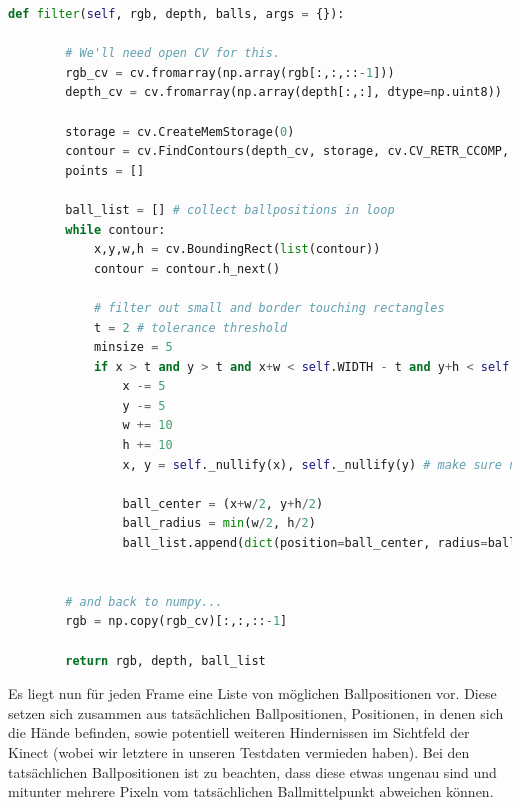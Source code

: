 \documentclass[12pt,a4paper,ngerman]{scrartcl}
\begin{document}
\vspace{0.5cm}
\begin{lstlisting}[language=Python,caption={RectsFilter.py, Ausschnitt}]
    def filter(self, rgb, depth, balls, args = {}):

        # We'll need open CV for this.
        rgb_cv = cv.fromarray(np.array(rgb[:,:,::-1]))
        depth_cv = cv.fromarray(np.array(depth[:,:], dtype=np.uint8))

        storage = cv.CreateMemStorage(0)
        contour = cv.FindContours(depth_cv, storage, cv.CV_RETR_CCOMP, cv.CV_CHAIN_APPROX_SIMPLE)
        points = []

        ball_list = [] # collect ballpositions in loop
        while contour:
            x,y,w,h = cv.BoundingRect(list(contour))
            contour = contour.h_next()

            # filter out small and border touching rectangles
            t = 2 # tolerance threshold
            minsize = 5
            if x > t and y > t and x+w < self.WIDTH - t and y+h < self.HEIGHT - t and w > minsize and h > minsize:
                x -= 5
                y -= 5
                w += 10
                h += 10
                x, y = self._nullify(x), self._nullify(y) # make sure nothing is smaller than 0

                ball_center = (x+w/2, y+h/2)
                ball_radius = min(w/2, h/2)
                ball_list.append(dict(position=ball_center, radius=ball_radius))


        # and back to numpy...
        rgb = np.copy(rgb_cv)[:,:,::-1]

        return rgb, depth, ball_list
\end{lstlisting}

Es liegt nun für jeden Frame eine Liste von möglichen Ballpositionen vor. Diese setzen sich zusammen aus tatsächlichen Ballpositionen, Positionen, in denen sich die Hände befinden, sowie potentiell weiteren Hindernissen im Sichtfeld der Kinect (wobei wir letztere in unseren Testdaten vermieden haben). Bei den tatsächlichen Ballpositionen ist zu beachten, dass diese etwas ungenau sind und mitunter mehrere Pixeln vom tatsächlichen Ballmittelpunkt abweichen können.
\end{document}
